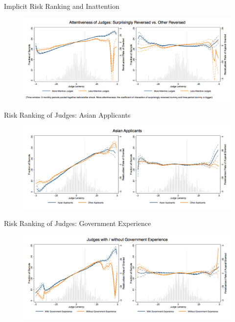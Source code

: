 \begin{frame}{Implicit Risk Ranking and Inattention}
    \begin{figure}
        \centering
        \includegraphics[height = 0.7 \textheight]{images/complete_surp_inattent.png}
    \end{figure}
    
\end{frame}

\begin{frame}{Risk Ranking of Judges: Asian Applicants}
    \begin{figure}
        \centering
        \includegraphics[height = 0.7 \textheight]{images/comp_asia.png}
    \end{figure}
\end{frame}

\begin{frame}{Risk Ranking of Judges: Government Experience}
    \begin{figure}
        \centering
        \includegraphics[height = 0.7 \textheight]{images/comp_govt_dum.png}
    \end{figure}
\end{frame}

